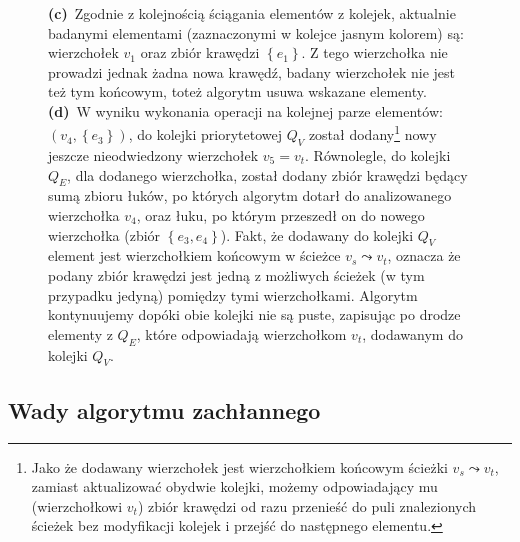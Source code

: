\begin{savenotes}
\begin{figure}
{			\textbf{(c)}~Zgodnie z kolejnością ściągania elementów z kolejek, aktualnie badanymi elementami (zaznaczonymi w kolejce jasnym kolorem) są: wierzchołek $v_{1}$ oraz zbiór krawędzi $\left\{ e_{1} \right\}$. Z tego wierzchołka nie prowadzi jednak żadna nowa krawędź, badany wierzchołek nie jest też tym końcowym, toteż algorytm usuwa wskazane elementy.
			\textbf{(d)}~W wyniku wykonania operacji na kolejnej parze elementów: $\left( v_{4}, \left\{ e_{3} \right\} \right)$, do kolejki priorytetowej $Q_{V}$ został dodany\footnote{Jako że dodawany wierzchołek jest wierzchołkiem końcowym ścieżki $v_{s} \leadsto v_{t}$, zamiast aktualizować obydwie kolejki, możemy odpowiadający mu (wierzchołkowi $v_{t}$) zbiór krawędzi od razu przenieść do puli znalezionych ścieżek bez modyfikacji kolejek i przejść do następnego elementu.} nowy jeszcze nieodwiedzony wierzchołek $v_{5} = v_{t}$. Równolegle, do kolejki $Q_{E}$, dla dodanego wierzchołka, został dodany zbiór krawędzi będący sumą zbioru łuków, po których algorytm dotarł do analizowanego wierzchołka $v_{4}$, oraz łuku, po którym przeszedł on do nowego wierzchołka (zbiór $\left\{ e_{3}, e_{4} \right\}$). Fakt, że dodawany do kolejki $Q_{V}$ element jest wierzchołkiem końcowym w ścieżce $v_{s} \leadsto v_{t}$, oznacza że podany zbiór krawędzi jest jedną z możliwych ścieżek (w tym przypadku jedyną) pomiędzy tymi wierzchołkami. Algorytm kontynuujemy dopóki obie kolejki nie są puste, zapisując po drodze elementy z $Q_{E}$, które odpowiadają wierzchołkom $v_{t}$, dodawanym do kolejki $Q_{V}$.
		}
		\label{fig:bfsExample}
	\end{figure}
\end{savenotes}

\subsection{Wady algorytmu zachłannego}

